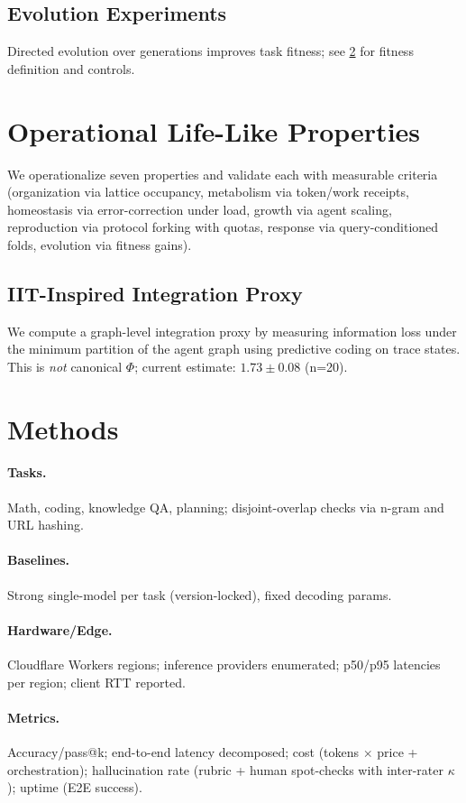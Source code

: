 \documentclass[11pt]{article}
\begin{document}
\subsection{Evolution Experiments}
Directed evolution over generations improves task fitness; see \cref{sec:methods} for fitness definition and controls.
\section{Operational Life-Like Properties}
We operationalize seven properties and validate each with measurable criteria (organization via lattice occupancy, metabolism via token/work receipts, homeostasis via error-correction under load, growth via agent scaling, reproduction via protocol forking with quotas, response via query-conditioned folds, evolution via fitness gains).
\subsection*{IIT-Inspired Integration Proxy}
We compute a graph-level integration proxy by measuring information loss under the minimum partition of the agent graph using predictive coding on trace states. This is \emph{not} canonical $\Phi$; current estimate: $1.73 \pm 0.08$ (n=20).
\section{Methods}
\label{sec:methods}
\paragraph{Tasks.} Math, coding, knowledge QA, planning; disjoint-overlap checks via n-gram and URL hashing.\\
\paragraph{Baselines.} Strong single-model per task (version-locked), fixed decoding params.\\
\paragraph{Hardware/Edge.} Cloudflare Workers regions; inference providers enumerated; p50/p95 latencies per region; client RTT reported.\\
\paragraph{Metrics.} Accuracy/pass@k; end-to-end latency decomposed; cost (tokens $\times$ price + orchestration); hallucination rate (rubric + human spot-checks with inter-rater $\kappa$); uptime (E2E success).\\
\end{document}
